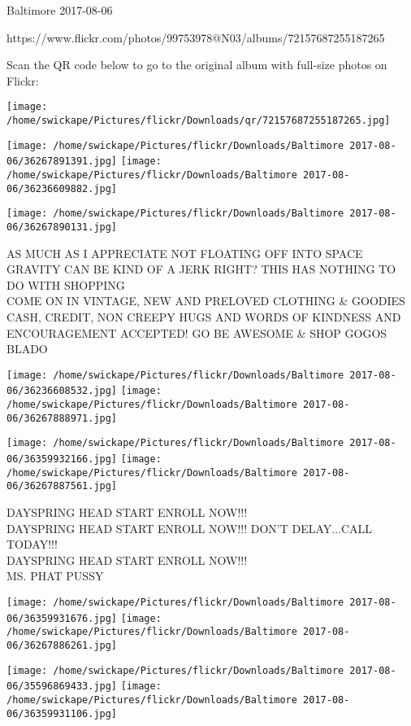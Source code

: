\documentclass[10pt,letterpaper]{article}
\begin{document}
Baltimore 2017-08-06

https://www.flickr.com/photos/99753978@N03/albums/72157687255187265

Scan the QR code below to go to the original album with full-size photos on Flickr:

\texttt{[image: /home/swickape/Pictures/flickr/Downloads/qr/72157687255187265.jpg]}
\pagebreak

\texttt{[image: /home/swickape/Pictures/flickr/Downloads/Baltimore 2017-08-06/36267891391.jpg]}
\texttt{[image: /home/swickape/Pictures/flickr/Downloads/Baltimore 2017-08-06/36236609882.jpg]}

\vspace{0.25in}
\texttt{[image: /home/swickape/Pictures/flickr/Downloads/Baltimore 2017-08-06/36267890131.jpg]}

AS MUCH AS I APPRECIATE NOT FLOATING OFF INTO SPACE GRAVITY CAN BE KIND OF A JERK RIGHT?  THIS HAS NOTHING TO DO WITH SHOPPING\\
COME ON IN VINTAGE, NEW AND PRELOVED CLOTHING \& GOODIES CASH, CREDIT, NON CREEPY HUGS AND WORDS OF KINDNESS AND ENCOURAGEMENT ACCEPTED!  GO BE AWESOME \& SHOP GOGOS\\
BLADO\\
\pagebreak

\texttt{[image: /home/swickape/Pictures/flickr/Downloads/Baltimore 2017-08-06/36236608532.jpg]}
\texttt{[image: /home/swickape/Pictures/flickr/Downloads/Baltimore 2017-08-06/36267888971.jpg]}

\texttt{[image: /home/swickape/Pictures/flickr/Downloads/Baltimore 2017-08-06/36359932166.jpg]}
\texttt{[image: /home/swickape/Pictures/flickr/Downloads/Baltimore 2017-08-06/36267887561.jpg]}

DAYSPRING HEAD START ENROLL NOW!!!\\
DAYSPRING HEAD START ENROLL NOW!!!  DON'T DELAY...CALL TODAY!!!\\
DAYSPRING HEAD START ENROLL NOW!!!\\
MS. PHAT PUSSY\\
\pagebreak

\texttt{[image: /home/swickape/Pictures/flickr/Downloads/Baltimore 2017-08-06/36359931676.jpg]}
\texttt{[image: /home/swickape/Pictures/flickr/Downloads/Baltimore 2017-08-06/36267886261.jpg]}

\texttt{[image: /home/swickape/Pictures/flickr/Downloads/Baltimore 2017-08-06/35596869433.jpg]}
\texttt{[image: /home/swickape/Pictures/flickr/Downloads/Baltimore 2017-08-06/36359931106.jpg]}
\end{document}
